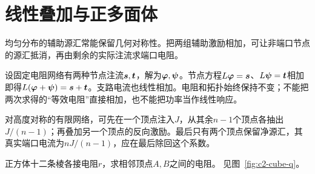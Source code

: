 \section{线性叠加与正多面体}\label{sec:c2-super}
均匀分布的辅助源汇常能保留几何对称性。把两组辅助激励相加，可让非端口节点的源汇抵消，再由剩余的实际注流求端口电阻。

设固定电阻网络有两种节点注流$\bm{s},\bm{t}$，解为$\bm{\varphi},\bm{\psi}$。节点方程$L\bm{\varphi}=\bm{s}$、$L\bm{\psi}=\bm{t}$相加即得$L(\bm{\varphi}+\bm{\psi})=\bm{s}+\bm{t}$。支路电流也线性相加。电阻和拓扑始终保持不变；不能把两次求得的“等效电阻”直接相加，也不能把功率当作线性响应。

对高度对称的有限网络，可先在一个顶点注入$J$，从其余$n-1$个顶点各抽出$J/(n-1)$；再叠加另一个顶点的反向激励。最后只有两个顶点保留净源汇，其真实端口电流为$nJ/(n-1)$，应在最后除回这个系数。

\begin{example}[正方体相邻顶点的电阻]\label{ex:c2-cube}
正方体十二条棱各接电阻$r$，求相邻顶点$A,B$之间的电阻。 见图~\ref{fig:c2-cube-q}。
\end{example}

